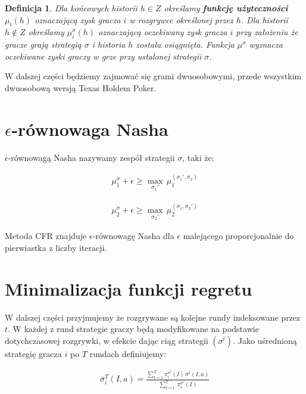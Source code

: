 \documentclass[licencjacka]{pracamgr}
\newtheorem{definition}[theorem]{Definicja}
\begin{document}
\begin{definition}
      Dla końcowych historii $h \in Z$ określamy \textbf{funkcję użyteczności} $\mu_i(h)$ oznaczającą zysk gracza $i$ w rozgrywce
      określonej przez $h$. Dla historii $h \notin Z$ określamy $\mu_i^{\sigma}(h)$ oznaczającą oczekiwany zysk gracza $i$
      przy założeniu że gracze grają strategią $\sigma$ i historia $h$ została osiągnięta. Funkcja $\mu^{\sigma}$ wyznacza
      oczekiwane zyski graczy w grze przy ustalonej strategii $\sigma$.
\end{definition}


\noindent
W dalszej części będziemy zajmować się grami dwuosobowymi, przede wszystkim dwuosobową wersją Texas Holdem Poker.

\section{$\epsilon$-równowaga Nasha}

$\epsilon$-równowagą Nasha nazywamy zespół strategii $\sigma$, taki że:

\begin{align*}
\mu_1^{\sigma} + \epsilon \geq  \max_{\sigma_1'} \, \mu_1^{(\sigma_1', \sigma_2)} 
\end{align*}

\begin{align*}
\mu_2^{\sigma} + \epsilon \geq  \max_{\sigma_2'} \, \mu_2^{(\sigma_1, \sigma_2')} 
\end{align*}

\noindent
Metoda CFR znajduje $\epsilon$-równowagę Nasha dla $\epsilon$ malejącego proporcjonalnie do pierwiastka z liczby iteracji.

\section{Minimalizacja funkcji regretu}

W dalszej części przyjmujemy że rozgrywane są kolejne rundy indeksowane przez $t$. W każdej z rund
strategie graczy będą modyfikowane na podstawie dotychczasowej rozgrywki, w efekcie dając ciąg strategii
$(\sigma^t)$. Jako uśrednioną strategię gracza $i$ po $T$ rundach definiujemy:

\begin{align*}
\overline{\sigma}_i^T(I, a) = \frac{\sum\limits_{t=1}^T \pi_i^{\sigma^t}(I) \, \sigma^t(I, a)}{\sum\limits_{t=1}^T \, \pi_i^{\sigma^t}(I)}
\end{align*}
\end{document}
